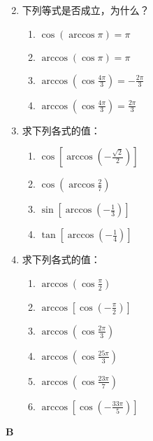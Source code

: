 \begin{enumerate}
\begin{multicols}{2}
\begin{enumerate}[(1)]
\end{enumerate}
\end{multicols}
    \item 下列等式是否成立，为什么？
\begin{multicols}{2}
\begin{enumerate}[(1)]
    \item $\cos(\arccos \pi)=\pi$
    \item $\arccos(\cos \pi) =\pi$
    \item $\arccos\left(\cos\frac{4\pi}{3}\right)=-\frac{2\pi}{3} $
    \item $\arccos \left(\cos\frac{4\pi}{3}\right)=\frac{2\pi}{3}$
\end{enumerate}
\end{multicols}
    \item 求下列各式的值： 
    \begin{multicols}{2}
\begin{enumerate}[(1)]
    \item $\cos \left[\arccos\left(-\frac{\sqrt{2}}{2}\right)\right]$
    \item $\cos \left(\arccos\frac{2}{7}\right)$
    \item $\sin \left[\arccos\left(-\frac{1}{3}\right)\right]$
    \item $\tan\left[\arccos\left(-\frac{1}{4}\right)\right] $
\end{enumerate}
\end{multicols}
    \item 求下列各式的值： 
    \begin{multicols}{2}
\begin{enumerate}[(1)]
    \item $\arccos \left(\cos\frac{\pi}{2}\right)$
    \item $\arccos \left[\cos\left(-\frac{\pi}{2}\right)\right]$
    \item $\arccos \left(\cos\frac{2\pi}{3}\right)$
    \item $\arccos \left(\cos\frac{25\pi}{3}\right)$
    \item $\arccos \left(\cos\frac{23\pi}{7}\right)$
    \item $\arccos \left[\cos\left(-\frac{33\pi}{5}\right)\right]$
\end{enumerate}
\end{multicols}
\end{enumerate}

\begin{center}
    \bfseries B
\end{center}

